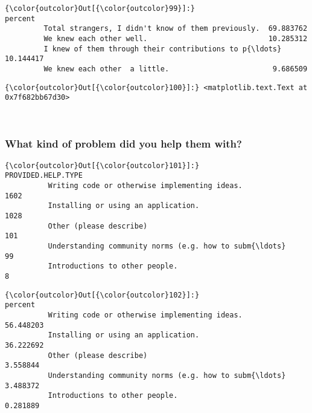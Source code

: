 \documentclass[11pt]{article}
\begin{document}
            \begin{Verbatim}[commandchars=\\\{\}]
{\color{outcolor}Out[{\color{outcolor}99}]:}                                                       percent
         Total strangers, I didn't know of them previously.  69.883762
         We knew each other well.                            10.285312
         I knew of them through their contributions to p{\ldots}  10.144417
         We knew each other  a little.                        9.686509
\end{Verbatim}
        

            \begin{Verbatim}[commandchars=\\\{\}]
{\color{outcolor}Out[{\color{outcolor}100}]:} <matplotlib.text.Text at 0x7f682bb67d30>
\end{Verbatim}
        
    \begin{center}
    \end{center}
    { \hspace*{\fill} \\}
    
    \subsubsection{What kind of problem did you help them
with?}\label{what-kind-of-problem-did-you-help-them-with}


            \begin{Verbatim}[commandchars=\\\{\}]
{\color{outcolor}Out[{\color{outcolor}101}]:}                                                     PROVIDED.HELP.TYPE
          Writing code or otherwise implementing ideas.                     1602
          Installing or using an application.                               1028
          Other (please describe)                                            101
          Understanding community norms (e.g. how to subm{\ldots}                  99
          Introductions to other people.                                       8
\end{Verbatim}
        

            \begin{Verbatim}[commandchars=\\\{\}]
{\color{outcolor}Out[{\color{outcolor}102}]:}                                                       percent
          Writing code or otherwise implementing ideas.       56.448203
          Installing or using an application.                 36.222692
          Other (please describe)                              3.558844
          Understanding community norms (e.g. how to subm{\ldots}   3.488372
          Introductions to other people.                       0.281889
\end{Verbatim}
        
\end{document}
